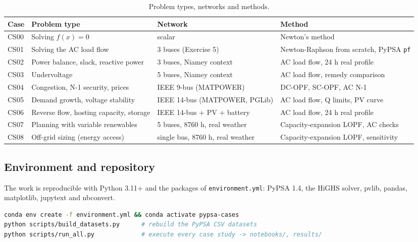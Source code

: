 \documentclass[11pt,a4paper]{article}
\begin{document}
\begin{table}[htbp]\centering\small
\caption{Problem types, networks and methods.}\label{tab:typology}
\begin{tabularx}{\textwidth}{@{}lXlX@{}}
\toprule
Case & Problem type & Network & Method \\
\midrule
CS00 & Solving $f(x)=0$ & scalar & Newton's method \\
CS01 & Solving the AC load flow & 3 buses (Exercise 5) & Newton-Raphson from scratch, PyPSA \texttt{pf} \\
CS02 & Power balance, slack, reactive power & 3 buses, Niamey context & AC load flow, 24 h real profile \\
CS03 & Undervoltage & 5 buses, Niamey context & AC load flow, remedy comparison \\
CS04 & Congestion, N-1 security, prices & IEEE 9-bus (MATPOWER) & DC-OPF, SC-OPF, AC N-1 \\
CS05 & Demand growth, voltage stability & IEEE 14-bus (MATPOWER, PGLib) & AC load flow, Q limits, PV curve \\
CS06 & Reverse flow, hosting capacity, storage & IEEE 14-bus + PV + battery & AC load flow, 24 h real profile \\
CS07 & Planning with variable renewables & 5 buses, 8760 h, real weather & Capacity-expansion LOPF, AC checks \\
CS08 & Off-grid sizing (energy access) & single bus, 8760 h, real weather & Capacity-expansion LOPF, sensitivity \\
\bottomrule
\end{tabularx}
\end{table}

\subsection{Environment and repository}
The work is reproducible with Python 3.11+ and the packages of \texttt{environment.yml}:
PyPSA 1.4, the HiGHS solver, pvlib, pandas, matplotlib, jupytext and nbconvert.

\begin{lstlisting}[language=bash]
conda env create -f environment.yml && conda activate pypsa-cases
python scripts/build_datasets.py      # rebuild the PyPSA CSV datasets
python scripts/run_all.py             # execute every case study -> notebooks/, results/
\end{lstlisting}
\end{document}
